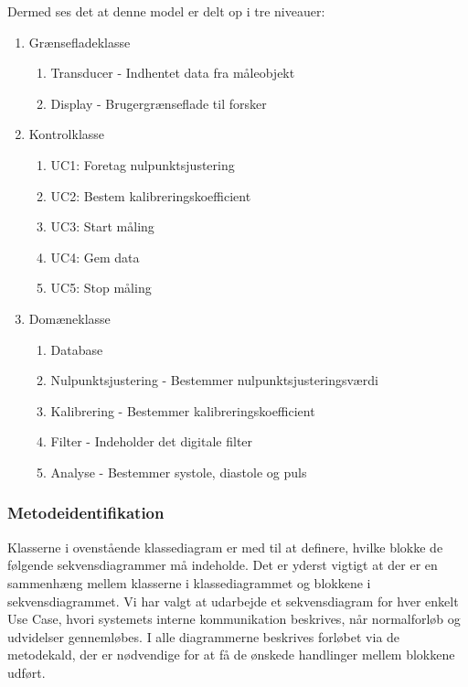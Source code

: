 Dermed ses det at denne model er delt op i tre niveauer:
\begin{enumerate}
\item Grænsefladeklasse
\begin{enumerate}
\item Transducer - Indhentet data fra måleobjekt
\item Display - Brugergrænseflade til forsker
\end{enumerate}
\item Kontrolklasse
\begin{enumerate}
\item UC1: Foretag nulpunktsjustering
\item UC2: Bestem kalibreringskoefficient
\item UC3: Start måling
\item UC4: Gem data
\item UC5: Stop måling
\end{enumerate}
\item Domæneklasse
\begin{enumerate}
\item Database
\item Nulpunktsjustering - Bestemmer nulpunktsjusteringsværdi
\item Kalibrering - Bestemmer kalibreringskoefficient
\item Filter - Indeholder det digitale filter
\item Analyse - Bestemmer systole, diastole og puls
\end{enumerate}
\end{enumerate}

\subsubsection{Metodeidentifikation}
Klasserne i ovenstående klassediagram er med til at definere, hvilke blokke de følgende sekvensdiagrammer må indeholde. Det er yderst vigtigt at der er en sammenhæng mellem klasserne i klassediagrammet og blokkene i sekvensdiagrammet. Vi har valgt at udarbejde et sekvensdiagram for hver enkelt Use Case, hvori systemets interne kommunikation beskrives, når normalforløb og udvidelser gennemløbes. I alle diagrammerne beskrives forløbet via de metodekald, der er nødvendige for at få de ønskede handlinger mellem blokkene udført. 

